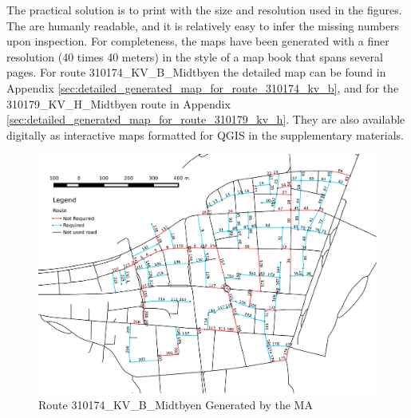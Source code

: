 The practical solution is to print with the size and resolution used in the figures. The are humanly readable, and it is relatively easy to infer the missing numbers upon inspection. For completeness, the maps have been generated with a finer resolution (40 times 40 meters) in the style of a map book that spans several pages. For route 310174\_KV\_B\_Midtbyen the detailed map can be found in Appendix \ref{sec:detailed_generated_map_for_route_310174_kv_b}, and for the 310179\_KV\_H\_Midtbyen route in Appendix \ref{sec:detailed_generated_map_for_route_310179_kv_h}. They are also available digitally as interactive maps formatted for QGIS in the supplementary materials.

\begin{landscape}
\begin{figure}[thbp]
    \centerline{\includegraphics[height=0.945\textwidth]{figures/Routes/Drawn/Rute_KV_B_Generert_Proper_Run.pdf}}
    \caption{Route 310174\_KV\_B\_Midtbyen Generated by the MA}
    \label{fig:KV_B_drawn}
\end{figure}
\end{landscape}

